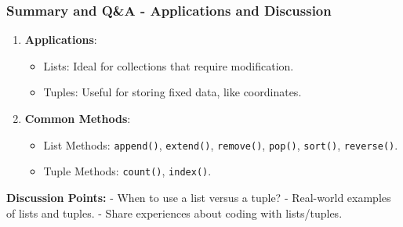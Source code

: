 \documentclass{beamer}
\begin{document}
\begin{frame}[fragile]
    \frametitle{Summary and Q\&A - Applications and Discussion}
    \begin{enumerate}[resume]
        \item \textbf{Applications}:
        \begin{itemize}
            \item Lists: Ideal for collections that require modification.
            \item Tuples: Useful for storing fixed data, like coordinates.
        \end{itemize}
        \item \textbf{Common Methods}:
        \begin{itemize}
            \item List Methods: \texttt{append()}, \texttt{extend()}, \texttt{remove()}, \texttt{pop()}, \texttt{sort()}, \texttt{reverse()}.
            \item Tuple Methods: \texttt{count()}, \texttt{index()}.
        \end{itemize}
    \end{enumerate}
    
    \textbf{Discussion Points:}  
    - When to use a list versus a tuple?  
    - Real-world examples of lists and tuples.  
    - Share experiences about coding with lists/tuples.  
\end{frame}
\end{document}
